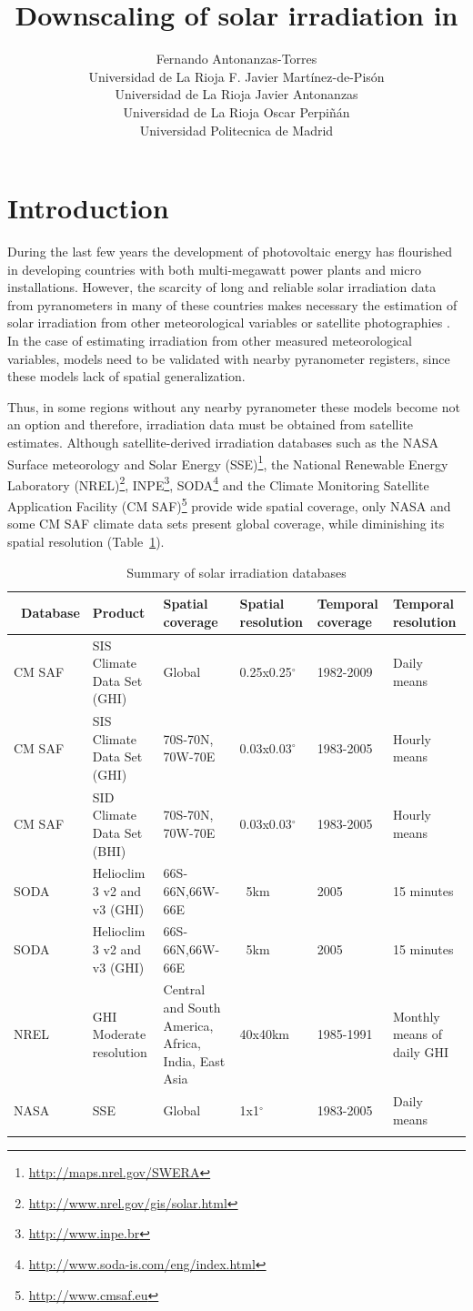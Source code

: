 \documentclass[article]{jss}
\author{Fernando Antonanzas-Torres\\Universidad de La Rioja \And
F. Javier Martínez-de-Pisón\\Universidad de La Rioja \AND
Javier Antonanzas \\Universidad de La Rioja \And 
Oscar Perpiñán\\ Universidad Politecnica de Madrid}
\title{Downscaling of solar irradiation in \proglang{R}}
\begin{document}
\section{Introduction}

During the last few years the development of photovoltaic energy has
flourished in developing countries with both multi-megawatt power
plants and micro installations. However, the scarcity of long and
reliable solar irradiation data from pyranometers in many of these
countries makes necessary the estimation of solar irradiation from
other meteorological variables or satellite photographies
\cite{Schulz.Albert.ea2009}. In the case of estimating irradiation
from other measured meteorological variables, models need to be
validated with nearby pyranometer registers, since these models lack
of spatial generalization.

Thus, in some regions without any nearby pyranometer these models
become not an option and therefore, irradiation data must be obtained
from satellite estimates. Although satellite-derived irradiation
databases such as the NASA Surface meteorology and Solar Energy
(SSE)\footnote{\url{http://maps.nrel.gov/SWERA}}, the National
Renewable Energy Laboratory
(NREL)\footnote{\url{http://www.nrel.gov/gis/solar.html}},
INPE\footnote{\url{http://www.inpe.br}},
SODA\footnote{\url{http://www.soda-is.com/eng/index.html}} and the
Climate Monitoring Satellite Application Facility (CM
SAF)\footnote{\url{http://www.cmsaf.eu}} provide wide spatial
coverage, only NASA and some CM SAF climate data sets present global
coverage, while diminishing its spatial resolution
(Table~\ref{tab:databases}).

\begin{small}
\begin{longtable}{p{}p{}p{}p{}p{}p{}}
  \toprule
\ Database&Product&Spatial coverage&Spatial resolution&Temporal coverage&Temporal resolution \\
\midrule
\endhead
CM SAF&SIS Climate Data Set (GHI)&Global&0.25x0.25$^\circ$&1982-2009&Daily means\\
\midrule
CM SAF&SIS Climate Data Set (GHI)&70S-70N, 70W-70E&0.03x0.03$^\circ$&1983-2005&Hourly means\\
\midrule
CM SAF&SID Climate Data Set (BHI)&70S-70N, 70W-70E&0.03x0.03$^\circ$&1983-2005&Hourly means\\
\midrule
SODA& Helioclim 3 v2 and v3 (GHI)&66S-66N,66W-66E&~5km&2005&15 minutes\\
\midrule
SODA& Helioclim 3 v2 and v3 (GHI)&66S-66N,66W-66E&~5km&2005&15 minutes\\
\midrule
NREL& GHI Moderate resolution&Central and South America, Africa, India, East Asia&40x40km&1985-1991&Monthly means of daily GHI\\
\midrule
NASA& SSE&Global&1x1$^\circ$&1983-2005&Daily means\\
\bottomrule
\caption{Summary of solar irradiation databases}
  \label{tab:databases}
\end{longtable}
\end{small}
\end{document}

